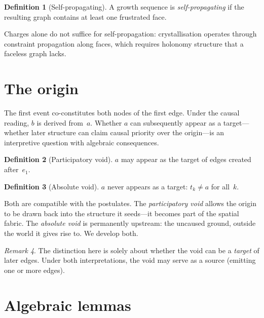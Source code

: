 \documentclass[11pt,a4paper]{article}
\theoremstyle{definition}
\newtheorem{definition}{Definition}[section]
\theoremstyle{plain}
\theoremstyle{remark}
\newtheorem{remark}[definition]{Remark}
\begin{document}
\begin{definition}[Self-propagating]\label{def:selfprop}
  A growth sequence is \emph{self-propagating} if the resulting graph contains at least one frustrated face.
\end{definition}

Charges alone do not suffice for self-propagation: crystallisation operates through constraint propagation along faces, which requires holonomy structure that a faceless graph lacks.

\section{The origin}\label{sec:origin}

The first event co-constitutes both nodes of the first edge.  Under the causal reading, $b$ is derived from~$a$.  Whether $a$ can subsequently appear as a target---whether later structure can claim causal priority over the origin---is an interpretive question with algebraic consequences.

\begin{definition}[Participatory void]\label{def:targetable}
  $a$ may appear as the target of edges created after~$e_1$.
\end{definition}

\begin{definition}[Absolute void]\label{def:nevertarget}
  $a$ never appears as a target: $t_k \neq a$ for all~$k$.
\end{definition}

Both are compatible with the postulates.  The \emph{participatory void} allows the origin to be drawn back into the structure it seeds---it becomes part of the spatial fabric.  The \emph{absolute void} is permanently upstream: the uncaused ground, outside the world it gives rise to.  We develop both.

\begin{remark}
  The distinction here is solely about whether the void can be a \emph{target} of later edges.  Under both interpretations, the void may serve as a source (emitting one or more edges).
\end{remark}

\section{Algebraic lemmas}\label{sec:lemmas}
\end{document}
